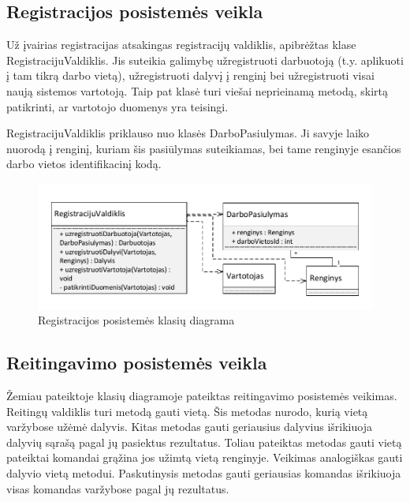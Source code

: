 \documentclass{VUMIFPSkursinis}
\begin{document}
		\subsection*{Registracijos posistemės veikla}
		Už įvairias registracijas atsakingas registracijų valdiklis, apibrėžtas klase RegistracijuValdiklis. Jis suteikia galimybę
		užregistruoti darbuotoją (t.y. aplikuoti į tam tikrą darbo vietą), užregistruoti dalyvį į renginį bei užregistruoti visai naują sistemos vartotoją.
		Taip pat klasė turi viešai neprieinamą metodą, skirtą patikrinti, ar vartotojo duomenys yra teisingi. \par
		RegistracijuValdiklis priklauso nuo klasės DarboPasiulymas. Ji savyje laiko nuorodą į renginį, kuriam šis pasiūlymas suteikiamas, bei tame renginyje esančios darbo vietos identifikacinį kodą.
		\begin{figure}[H]
			\centering
			\includegraphics[width=\textwidth]{img/KlasiuDiagramaRegistracija}
			\caption{Registracijos posistemės klasių diagrama}
			\label{fig:RegistracijosKlasiuDiagrama}
		\end{figure}

		\subsection*{Reitingavimo posistemės veikla}
		
		Žemiau pateiktoje klasių diagramoje pateiktas reitingavimo posistemės veikimas.
		Reitingų valdiklis turi metodą gauti vietą. 
		Šis metodas nurodo, kurią vietą varžybose užėmė dalyvis.
		Kitas metodas gauti geriausius dalyvius išrikiuoja dalyvių sąrašą pagal jų pasiektus rezultatus.
		Toliau pateiktas metodas gauti vietą pateiktai komandai grąžina jos užimtą vietą renginyje.
		Veikimas analogiškas gauti dalyvio vietą metodui.
		Paskutinysis metodas gauti geriausias komandas išrikiuoja visas komandas varžybose pagal jų rezultatus.
		
\end{document}
